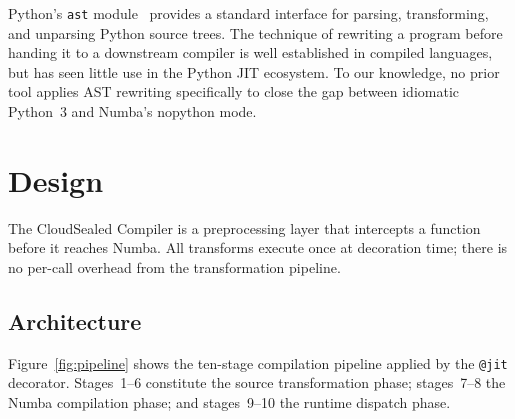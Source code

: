 \documentclass[journal]{IEEEtran}
\begin{document}
Python's \texttt{ast} module~\cite{psf2023ast} provides a standard interface
for parsing, transforming, and unparsing Python source trees. The technique of
rewriting a program before handing it to a downstream compiler is well
established in compiled languages, but has seen little use in the Python
JIT ecosystem. To our knowledge, no prior tool applies AST rewriting
specifically to close the gap between idiomatic Python~3 and Numba's nopython
mode.

\section{Design}

The CloudSealed Compiler is a preprocessing layer that intercepts a function
before it reaches Numba. All transforms execute once at decoration time;
there is no per-call overhead from the transformation pipeline.

\subsection{Architecture}

Figure~\ref{fig:pipeline} shows the ten-stage compilation pipeline applied
by the \texttt{@jit} decorator. Stages~1–6 constitute the source
transformation phase; stages~7–8 the Numba compilation phase; and stages~9–10
the runtime dispatch phase.
\end{document}

